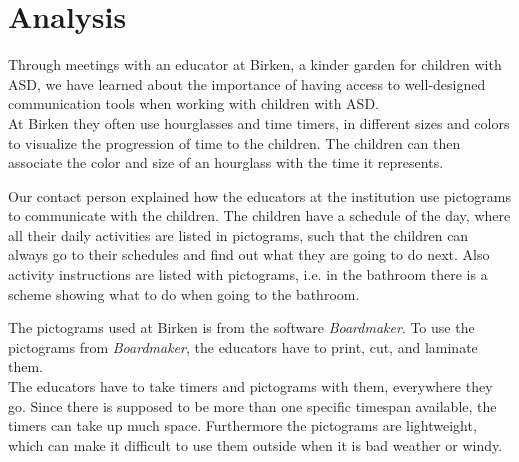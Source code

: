\chapter{Analysis}
\label{cha:analysis}
Through meetings with an educator at Birken, a kinder garden for children with ASD, we have learned about the importance of having access to well-designed communication tools when working with children with ASD.\\

At Birken they often use hourglasses and time timers, in different sizes and colors to visualize the progression of time to the children. The children can then associate the color and size of an hourglass with the time it represents.

Our contact person explained how the educators at the institution use pictograms to communicate with the children. The children have a schedule of the day, where all their daily activities are listed in pictograms, such that the children can always go to their schedules and find out what they are going to do next. Also activity instructions are listed with pictograms, i.e. in the bathroom there is a scheme showing what to do when going to the bathroom.

The pictograms used at Birken is from the software \textit{Boardmaker}\cite{web:boardmaker}. To use the pictograms from \textit{Boardmaker}, the educators have to print, cut, and laminate them.\\

The educators have to take timers and pictograms with them, everywhere they go. Since there is supposed to be more than one specific timespan available, the timers can take up much space. Furthermore the pictograms are lightweight, which can make it difficult to use them outside when it is bad weather or windy.